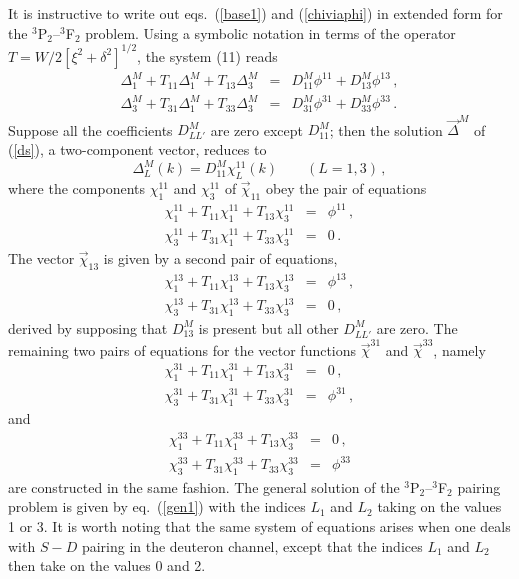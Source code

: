 It is instructive to write out eqs.~(\ref{base1}) and (\ref{chiviaphi})
in extended form for the $^3$P$_2$--$^3$F$_2$ problem.  Using a symbolic
notation in terms of the operator $T=W/ 2[\xi^2+\delta^2]^{1/2}$, the
system (11) reads
\begin{eqnarray}
\Delta^M_1+T_{11} \Delta^M_1+T_{13} \Delta^M_3&=&D^M_{11}\phi^{11}+D^M_{13}
\phi^{13} \, ,\nonumber \\
\Delta^M_3+T_{31} \Delta^M_1+T_{33} \Delta^M_3&=&D^M_{31}\phi^{31}+D^M_{33}
\phi^{33} \, .
\label{ds}
\end{eqnarray}
Suppose all the coefficients $D^M_{LL'}$ are zero except $D^M_{11}$; then the
solution ${\vec \Delta}^M$ of (\ref{ds}), a two-component vector,
reduces to
\begin{equation}
\Delta^M_L(k)=D^M_{11}\chi^{11}_L(k) \qquad (L=1,3)\, ,
\label{sol}
\end{equation}
where the components $\chi^{11}_1$ and $\chi^{11}_3$ of ${\vec \chi}_{11}$
obey the pair of equations
\begin{eqnarray}
\chi^{11}_1+T_{11} \chi^{11}_1+T_{13} \chi^{11}_3&=&\phi^{11}
\, , \nonumber \\
\chi^{11}_3+T_{31} \chi^{11}_1+T_{33} \chi^{11}_3&=&0 \, .
\end{eqnarray}
The vector ${\vec \chi}_{13}$ is given by a second pair of equations,
\begin{eqnarray}
\chi^{13}_1+T_{11} \chi^{13}_1+T_{13} \chi^{13}_3&=&\phi^{13}
\, , \nonumber \\
\chi^{13}_3+T_{31} \chi^{13}_1+T_{33} \chi^{13}_3&=&0 \, ,
\end{eqnarray}
derived by supposing that $D^M_{13}$ is present but all other
$D_{LL'}^M$ are zero.
The remaining two pairs of equations for the vector functions
${\vec\chi}^{31}$ and ${\vec\chi}^{33}$, namely
\begin{eqnarray}
\chi^{31}_1+T_{11} \chi^{31}_1+T_{13} \chi^{31}_3&=&0
\, , \nonumber \\
\chi^{31}_3+T_{31} \chi^{31}_1+T_{33} \chi^{31}_3&=&\phi^{31}
\, ,
\end{eqnarray}
and
\begin{eqnarray}
\chi^{33}_1+T_{11} \chi^{33}_1+T_{13} \chi^{33}_3&=&0
\, , \nonumber \\
\chi^{33}_3+T_{31} \chi^{33}_1+T_{33} \chi^{33}_3&=&\phi^{33}
\end{eqnarray}
are constructed in the same fashion.  The general solution of the 
$^3$P$_2$--$^3$F$_2$ pairing problem is given by eq.~(\ref{gen1}) 
with the indices $L_1$ and $L_2$ taking on the values 1 or 3.  It 
is worth noting that the same system of equations arises when one 
deals with $S-D$ pairing in the deuteron channel, except that the 
indices $L_1$ and $L_2$ then take on the values 0 and 2.


